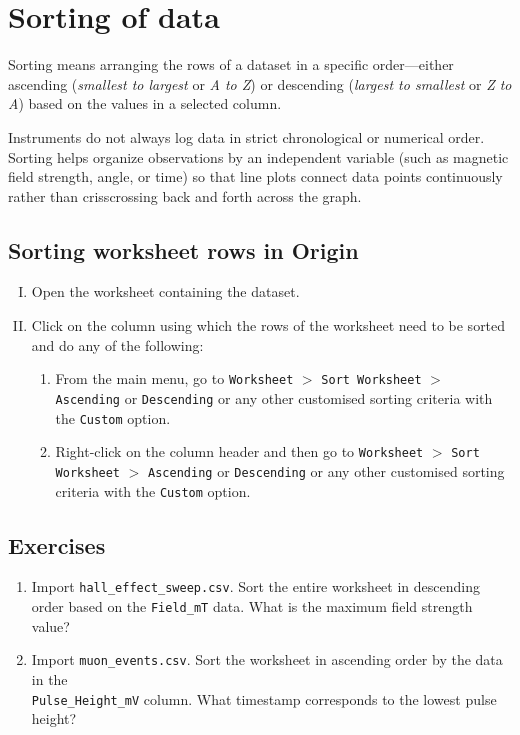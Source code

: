 \section{Sorting of data}
	Sorting means arranging the rows of a dataset in a specific order—either ascending (\emph{smallest to largest} or \emph{A to Z}) or descending (\emph{largest to smallest} or \emph{Z to A}) based on the values in a selected column.
	
	Instruments do not always log data in strict chronological or numerical order. Sorting helps organize observations by an independent variable (such as magnetic field strength, angle, or time) so that line plots connect data points continuously rather than crisscrossing back and forth across the graph.
	
	\subsection{Sorting worksheet rows in Origin}
		\begin{enumerate}[I.]
			\item Open the worksheet containing the dataset.
			
			\item Click on the column using which the rows of the worksheet need to be sorted and do any of the following:
			\begin{enumerate}
				\item From the main menu, go to \verb|Worksheet| $>$ \verb|Sort Worksheet| $>$ \verb|Ascending| or \verb|Descending| or any other customised sorting criteria with the \verb|Custom| option.
				\item Right-click on the column header and then go to \verb|Worksheet| $>$ \verb|Sort Worksheet| $>$ \verb|Ascending| or \verb|Descending| or any other customised sorting criteria with the \verb|Custom| option.
			\end{enumerate}
		\end{enumerate}
		
	\subsection*{Exercises}
		\begin{enumerate}
			\item Import \verb|hall_effect_sweep.csv|. Sort the entire worksheet in descending order based on the \verb|Field_mT| data. What is the maximum field strength value?
			
			\item Import \verb|muon_events.csv|. Sort the worksheet in ascending order by the data in the\\ \verb|Pulse_Height_mV| column. What timestamp corresponds to the lowest pulse height?
		\end{enumerate}